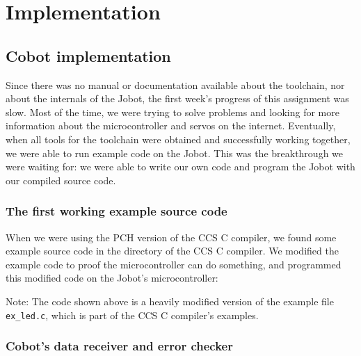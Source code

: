 \documentclass[a4paper,10pt]{article} %
\begin{document}

\pagebreak

\section{Implementation} %
\label{sec:Implementation}

\subsection{Cobot implementation} %
\label{sub:Cobot implementation}

Since there was no manual or documentation available about the toolchain, nor
about the internals of the Jobot, the first week's progress of this assignment
was slow. Most of the time, we were trying to solve problems and looking for
more information about the microcontroller and servos on the internet.
Eventually, when all tools for the toolchain were obtained and successfully
working together, we were able to run example code on the Jobot. This was the
breakthrough we were waiting for: we were able to write our own code and program
the Jobot with our compiled source code.

\subsubsection{The first working example source code} %
\label{ssub:The first working example source code}

When we were using the PCH version of the CCS C compiler, we found some example
source code in the directory of the CCS C compiler. We modified the example code
to proof the microcontroller can do something, and programmed this modified code
on the Jobot's microcontroller:



\noindent Note: The code shown above is a heavily modified version of the
example file \texttt{ex\_led.c}, which is part of the CCS C compiler's examples.


\subsubsection{Cobot's data receiver and error checker} %
\label{ssub:Cobot's data receiver and error checker}



\end{document}
